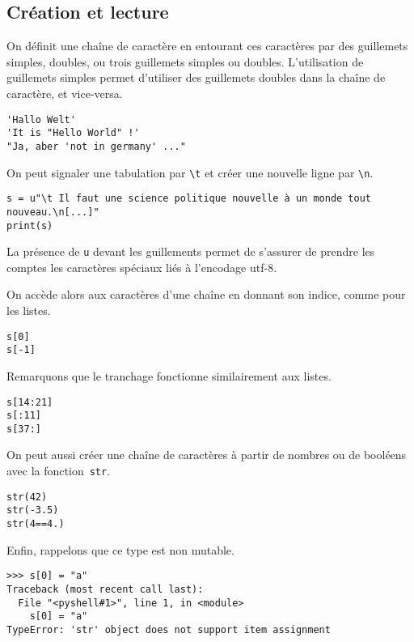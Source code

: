 \subsection{Création et lecture}

On définit une chaîne de caractère en entourant ces caractères par des guillemets simples, doubles, ou trois guillemets simples ou doubles. 
L'utilisation de guillemets simples permet d'utiliser des guillemets doubles dans la chaîne de caractère, et vice-versa.
\begin{lstlisting}
'Hallo Welt'
'It is "Hello World" !'
"Ja, aber 'not in germany' ..."
\end{lstlisting}

On peut signaler une tabulation par \texttt{\textbackslash t} et créer une nouvelle ligne par \texttt{\textbackslash n}.

\begin{lstlisting}
s = u"\t Il faut une science politique nouvelle à un monde tout nouveau.\n[...]"
print(s)
\end{lstlisting}


\begin{remarque}
La présence de \texttt{u} devant les guillements permet de s'assurer de prendre les comptes les caractères spéciaux liés à l'encodage utf-8.
\end{remarque}

On accède alors aux caractères d'une chaîne en donnant son indice, comme pour les listes. 
\begin{lstlisting}
s[0]
s[-1]
\end{lstlisting}
Remarquons que le tranchage fonctionne similairement aux listes.
\begin{lstlisting}
s[14:21]
s[:11]
s[37:]
\end{lstlisting}
On peut aussi créer une chaîne de caractères à partir de nombres ou de booléens avec la fonction~\texttt{str}.
\begin{lstlisting}
str(42)
str(-3.5)
str(4==4.)
\end{lstlisting}

Enfin, rappelons que ce type est non mutable.
\begin{lstlisting}
>>> s[0] = "a"
Traceback (most recent call last):
  File "<pyshell#1>", line 1, in <module>
    s[0] = "a"
TypeError: 'str' object does not support item assignment
\end{lstlisting}

